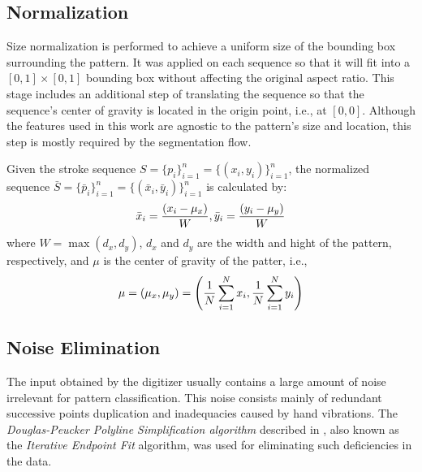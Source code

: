 \subsection{Normalization}
\iftoggle{edit-mode}{\hspace{0pt}\marginpar{Goal}}{}
Size normalization is performed to achieve a uniform size of the bounding box surrounding the pattern. 
It was applied on each sequence so that it will fit into a $[0,1]\times[0,1]$ bounding box without affecting the original aspect ratio. 
This stage includes an additional step of translating the sequence so that the sequence's center of gravity is located in the origin point, i.e., at $[0,0]$.
Although the features used in this work are agnostic to the pattern's size and location, this step is mostly required by the segmentation flow.

\iftoggle{edit-mode}{\hspace{0pt}\marginpar{Approach}}{}
Given the stroke sequence $S=\{p_i\}_{i=1}^{n}=\{(x_i,y_i)\}_{i=1}^{n}$, the normalized sequence $\bar{S}=\{\bar p_i \}_{i=1}^{n}=\{(\bar x_i,\bar y_i)\}_{i=1}^{n}$ is calculated by: 
\begin{equation}
{\bar x_i} = {{\left( {{x_i} - {\mu _x}} \right)} \over W},{\bar y_i} = {{\left( {{y_i} - {\mu _y}} \right)} \over W}
\end{equation}
where $W = \max (d_x,d_y)$, $d_x$ and $d_y$ are the width and hight of the pattern, respectively, and $\mu$ is the center of gravity of the patter, i.e., 
\begin{equation}
\mu  = \left( {{\mu _x},{\mu _y}} \right) = \left( {{1 \over N}\sum\limits_{i = 1}^N {{x_i}} ,{1 \over N}\sum\limits_{i = 1}^N {{y_i}} } \right)
\end{equation}


\subsection{Noise Elimination}

\iftoggle{edit-mode}{\hspace{0pt}\marginpar{Introduction}}{}
The input obtained by the digitizer usually contains a large amount of noise irrelevant for pattern classification. 
This noise consists mainly of redundant successive points duplication and inadequacies caused by hand vibrations. 
The \emph{Douglas-Peucker Polyline Simplification algorithm} described in \cite{douglas1973algorithms}, also known as the \emph{Iterative Endpoint Fit} algorithm, was used for eliminating such deficiencies in the data. 

